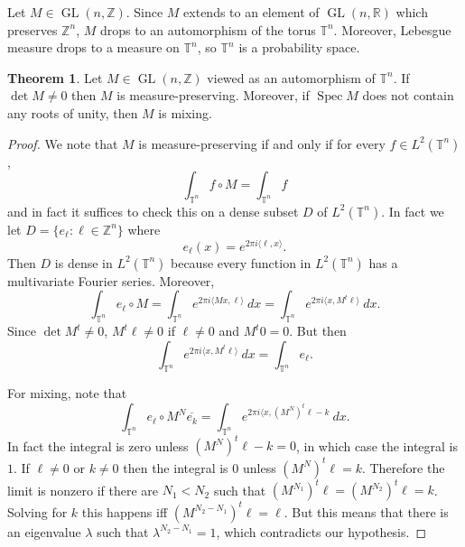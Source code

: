 \documentclass[12pt]{report}
\newcommand{\ZZ}{\mathbb{Z}}
\newcommand{\RR}{\mathbb{R}}
\newcommand{\TT}{\mathbb{T}}
\newcommand{\GL}{\operatorname{GL}}
\newcommand{\Spec}{\operatorname{Spec}}
\theoremstyle{definition}
\newtheorem{theorem}{Theorem}[chapter]
\begin{document}
Let $M \in \GL(n, \ZZ)$. Since $M$ extends to an element of $\GL(n, \RR)$ which preserves $\ZZ^n$, $M$ drops to an automorphism of the torus $\TT^n$. Moreover, Lebesgue measure drops to a measure on $\TT^n$, so $\TT^n$ is a probability space.
\begin{theorem}
Let $M \in \GL(n, \ZZ)$ viewed as an automorphism of $\TT^n$. If $\det M \neq 0$ then $M$ is measure-preserving. Moreover, if $\Spec M$ does not contain any roots of unity, then $M$ is mixing.
\end{theorem}
\begin{proof}
We note that $M$ is measure-preserving if and only if for every $f \in L^2(\TT^n)$,
$$\int_{\TT^n} f \circ M = \int_{\TT^n} f$$
and in fact it suffices to check this on a dense subset $D$ of $L^2(\TT^n)$. In fact we let $D = \{e_\ell: \ell \in \ZZ^n\}$ where
$$e_\ell(x) = e^{2\pi i\langle \ell, x\rangle}.$$
Then $D$ is dense in $L^2(\TT^n)$ because every function in $L^2(\TT^n)$ has a multivariate Fourier series. Moreover,
$$\int_{\TT^n} e_\ell \circ M = \int_{\TT^n} e^{2\pi i\langle Mx, \ell\rangle} ~dx = \int_{\TT^n} e^{2\pi i\langle x, M^t\ell\rangle} ~dx.$$
Since $\det M^t \neq 0$, $M^t\ell \neq 0$ if $\ell \neq 0$ and $M^t0 = 0$. But then
$$\int_{\TT^n} e^{2\pi i\langle x, M^t\ell\rangle} ~dx = \int_{\TT^n} e_\ell.$$

For mixing, note that
$$\int_{\TT^n} e_\ell \circ M^N \overline{e_k} = \int_{\TT^n} e^{2\pi i\langle x, (M^N)^t \ell - k} ~dx.$$
In fact the integral is zero unless $(M^N)^t \ell - k = 0$, in which case the integral is $1$. If $\ell \neq 0$ or $k \neq 0$ then the integral is $0$ unless $(M^N)^t \ell = k$. Therefore the limit is nonzero if there are $N_1 < N_2$ such that $(M^{N_1})^t \ell = (M^{N_2})^t \ell = k$.
Solving for $k$ this happens iff $(M^{N_2 - N_1})^t \ell = \ell$. But this means that there is an eigenvalue $\lambda$ such that $\lambda^{N_2 - N_1} = 1$, which contradicts our hypothesis.
\end{proof}
\end{document}
